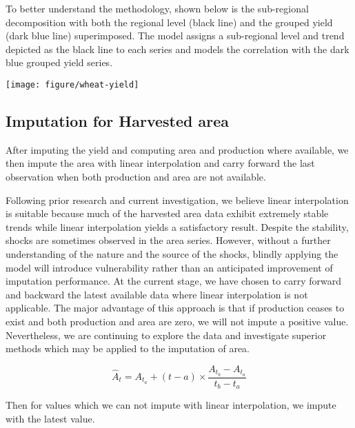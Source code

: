 \documentclass[nojss]{jss}\usepackage{graphicx, color}
\makeatletter
\def\maxwidth{ %
  \ifdim\Gin@nat@width>\linewidth
    \linewidth
  \else
    \Gin@nat@width
  \fi
}
\newenvironment{knitrout}{}{} %
\makeatother
\begin{document}
To better understand the methodology, shown below is the sub-regional
decomposition with both the regional level (black line) and the
grouped yield (dark blue line) superimposed. The model assigns a
sub-regional level and trend depicted as the black line to each series
and models the correlation with the dark blue grouped yield series.


\begin{knitrout}
\color{fgcolor}

{\centering \texttt{[image: figure/wheat-yield]} 

}



\end{knitrout}




\subsection{Imputation for Harvested area}
After imputing the yield and computing area and production where
available, we then impute the area with linear interpolation and carry
forward the last observation when both production and area are not
available.

Following prior research and current investigation, we believe linear
interpolation is suitable because much of the harvested area data
exhibit extremely stable trends while linear interpolation yields a
satisfactory result. Despite the stability, shocks are sometimes
observed in the area series.  However, without a further understanding
of the nature and the source of the shocks, blindly applying the model
will introduce vulnerability rather than an anticipated improvement of
imputation performance. At the current stage, we have chosen to carry
forward and backward the latest available data where linear
interpolation is not applicable. The major advantage of this approach
is that if production ceases to exist and both production and area are
zero, we will not impute a positive value. Nevertheless, we are
continuing to explore the data and investigate superior methods which
may be applied to the imputation of area.


\begin{equation}
  \label{eq:linearInterpolation}
  \hat{A}_t = A_{t_a} + (t - a) \times \frac{A_{t_b} - A_{t_a}}{t_b - t_a}
\end{equation}

Then for values which we can not impute with linear interpolation, we
impute with the latest value.
\end{document}
